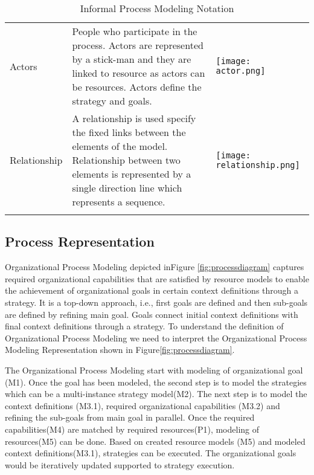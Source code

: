 \begin{center}
\begin{longtable}{p{3cm}p{10cm}p{3cm}}
		Actors					& People who participate in the process. Actors are represented by a stick-man and they are linked to resource as actors can be resources. Actors define the strategy and goals.  & \begin{center} \texttt{[image: actor.png]} \end{center}   \\
		
		Relationship				& A relationship is used specify the fixed links between the elements of the model. Relationship between two elements is represented by a single direction line which represents a sequence.  & \begin{center} \texttt{[image: relationship.png]} \end{center}   \\
		
		
		\bottomrule
		\caption{Informal Process Modeling Notation}
		\label{tab:notations}		
	\end{longtable}	
\end{center}



\subsection{Process Representation}
Organizational Process Modeling depicted inFigure \ref{fig:processdiagram} captures required organizational capabilities that are satisfied by resource models  to enable the achievement of organizational goals in certain context definitions through a strategy. It is a top-down approach, i.e., first goals are defined and then sub-goals  are defined by refining main goal. Goals connect initial context definitions with final context definitions through a strategy.  To understand the definition of Organizational Process Modeling we need to interpret the Organizational Process Modeling Representation shown in Figure\ref{fig:processdiagram}. 

 The Organizational Process Modeling start with modeling of organizational goal (M1). Once the goal has been modeled, the second step is to model the strategies which can be a multi-instance strategy model(M2). The next step is to model the context definitions (M3.1), required organizational capabilities (M3.2) and refining the sub-goals from main goal in parallel. Once the required capabilities(M4) are matched by required resources(P1), modeling of resources(M5) can be done.  Based on created resource models (M5) and modeled context definitions(M3.1), strategies can be executed. The organizational goals would be iteratively updated supported to strategy execution.  


